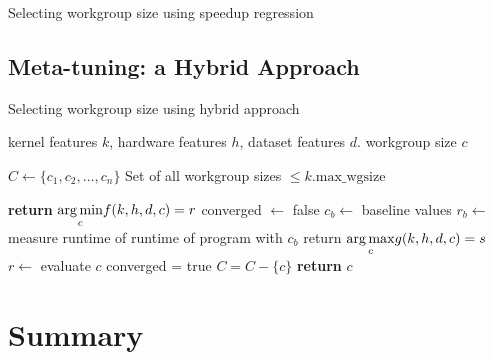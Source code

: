 \begin{algorithm}

\caption{Selecting workgroup size using speedup regression}
\label{alg:autotune-speedup-regression}
\end{algorithm}


\subsection{Meta-tuning: a Hybrid Approach}

\begin{algorithm}
\caption{Selecting workgroup size using hybrid approach}
\label{alg:autotune-hybrid}
\begin{algorithmic}[1]
\Require kernel features $k$, hardware features $h$, dataset features $d$.
\Ensure workgroup size $c$

\State $C \leftarrow \{ c_1, c_2,\ldots, c_n \}$
\Comment Set of all workgroup sizes $\le k.\text{max\_wgsize}$

    \State \textbf{return} $\underset{c}{\operatorname*{arg\,min}} f(k,h,d,c) = r$
\Else
   \State converged $\leftarrow$ false
   \State $c_b \leftarrow$ baseline values
   \State $r_b \leftarrow$ measure runtime of runtime of program with $c_b$
     \State return $\underset{c}{\operatorname*{arg\,max}} g(k,h,d,c) = s$
     \State $r \leftarrow$ evaluate $c$
       \State converged = true
     \Else
       \State $C = C - \{c\}$
     \EndIf
   \EndWhile
   \State \textbf{return} $c$
\EndIf
\end{algorithmic}
\end{algorithm}

\section{Summary}
